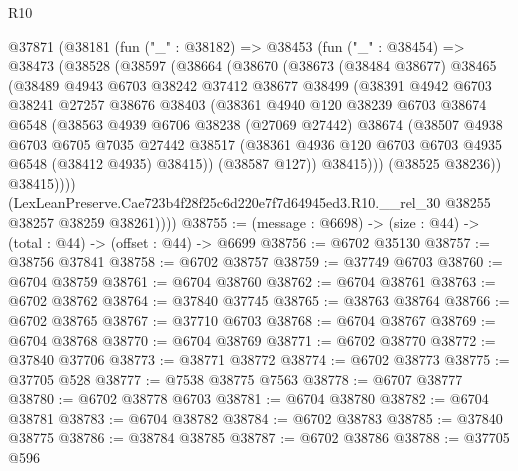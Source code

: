 \begin{lexlean}{R10}
\begin{coremodule}
  @37871
    (@38181
      (fun ("_" : @38182) =>
      @38453
        (fun ("_" : @38454) =>
        @38473
          (@38528
            (@38597
              (@38664
                (@38670
                  (@38673
                    (@38484 @38677)
                    @38465
                    (@38489
                      @4943
                      @6703
                      @38242
                      @37412
                      @38677
                      @38499
                      (@38391
                        @4942
                        @6703
                        @38241
                        @27257
                        @38676
                        @38403
                        (@38361
                          @4940
                          @120
                          @38239
                          @6703
                          @38674
                          @6548
                          (@38563
                            @4939
                            @6706
                            @38238
                            (@27069 @27442)
                            @38674
                            (@38507
                              @4938
                              @6703
                              @6705
                              @7035
                              @27442
                              @38517
                              (@38361 @4936 @120 @6703 @6703 @4935 @6548 (@38412 @4935) @38415))
                            (@38587 @127))
                          @38415)))
                    (@38525 @38236))
                  @38415))))
          (LexLeanPreserve.Cae723b4f28f25c6d220e7f7d64945ed3.R10.__rel_30
            @38255
            @38257
            @38259
            @38261))))
@38755 := (message : @6698) -> (size : @44) -> (total : @44) -> (offset : @44) -> @6699
@38756 := @6702 @35130
@38757 := @38756 @37841
@38758 := @6702 @38757
@38759 := @37749 @6703
@38760 := @6704 @38759
@38761 := @6704 @38760
@38762 := @6704 @38761
@38763 := @6702 @38762
@38764 := @37840 @37745
@38765 := @38763 @38764
@38766 := @6702 @38765
@38767 := @37710 @6703
@38768 := @6704 @38767
@38769 := @6704 @38768
@38770 := @6704 @38769
@38771 := @6702 @38770
@38772 := @37840 @37706
@38773 := @38771 @38772
@38774 := @6702 @38773
@38775 := @37705 @528
@38777 := @7538 @38775 @7563
@38778 := @6707 @38777
@38780 := @6702 @38778 @6703
@38781 := @6704 @38780
@38782 := @6704 @38781
@38783 := @6704 @38782
@38784 := @6702 @38783
@38785 := @37840 @38775
@38786 := @38784 @38785
@38787 := @6702 @38786
@38788 := @37705 @596

\end{coremodule}
\end{lexlean}
